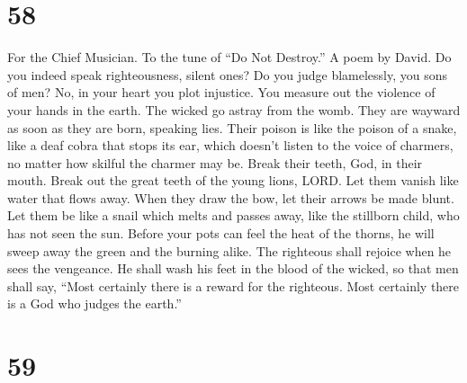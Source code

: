\hypertarget{section-57}{%
\section{58}\label{section-57}}

For the Chief Musician. To the tune of ``Do Not Destroy.'' A poem by
David.  Do you indeed speak righteousness, silent ones? Do
you judge blamelessly, you sons of men?  No, in your heart
you plot injustice. You measure out the violence of your hands in the
earth.  The wicked go astray from the womb. They are wayward
as soon as they are born, speaking lies.  Their poison is
like the poison of a snake, like a deaf cobra that stops its ear,
 which doesn't listen to the voice of charmers, no matter
how skilful the charmer may be.  Break their teeth, God, in
their mouth. Break out the great teeth of the young lions, LORD.
 Let them vanish like water that flows away. When they draw
the bow, let their arrows be made blunt.  Let them be like a
snail which melts and passes away, like the stillborn child, who has not
seen the sun.  Before your pots can feel the heat of the
thorns, he will sweep away the green and the burning alike.
 The righteous shall rejoice when he sees the vengeance. He
shall wash his feet in the blood of the wicked,  so that
men shall say, ``Most certainly there is a reward for the righteous.
Most certainly there is a God who judges the earth.''

\hypertarget{section-58}{%
\section{59}\label{section-58}}

